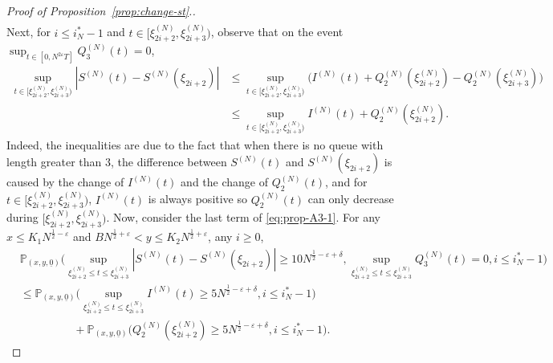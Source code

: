 \documentclass[11pt, reqno]{article}
\numberwithin{equation}{section}
\numberwithin{theorem}{section}
\begin{document}
\begin{appendix}
\begin{proof}[Proof of Proposition~\ref{prop:change-st}.]
\begin{align}
\end{align}
Next, for  $i\leq i^*_N-1$ and $t\in[\xi^{(N)}_{2i+2},\xi^{(N)}_{2i+3})$, observe that on the event $\sup_{t\in [0, N^{2\varepsilon}T]}Q_3^{(N)}(t) =0$, 
\begin{align*}
   \sup_{t\in[\xi^{(N)}_{2i+2},\xi^{(N)}_{2i+3})}\left| S^{(N)}(t)-S^{(N)}(\xi_{2i+2})\right| &\leq \sup_{t\in[\xi^{(N)}_{2i+2},\xi^{(N)}_{2i+3})}\Big(I^{(N)}(t)+Q_2^{(N)}(\xi^{(N)}_{2i+2})-Q_2^{(N)}(\xi^{(N)}_{2i+3})\Big)\\
   & \le \sup_{t\in[\xi^{(N)}_{2i+2},\xi^{(N)}_{2i+3})}I^{(N)}(t) + Q_2^{(N)}(\xi^{(N)}_{2i+2}).
\end{align*}
Indeed, the inequalities are due to the fact that when there is no queue with length greater than $3$, the difference between $S^{(N)}(t)$ and $S^{(N)}(\xi_{2i+2})$ is caused by the change of $I^{(N)}(t)$ and the change of $Q_2^{(N)}(t)$, and for $t\in[\xi^{(N)}_{2i+2},\xi^{(N)}_{2i+3})$, $I^{(N)}(t)$ is always positive so $Q_2^{(N)}(t)$ can only decrease during $[\xi^{(N)}_{2i+2},\xi^{(N)}_{2i+3})$. 
Now, consider the last term of \eqref{eq:prop-A3-1}. For any $x\leq K_1N^{\frac{1}{2} - \varepsilon}$ and $BN^{\frac{1}{2} + \varepsilon} <y\leq K_2N^{\frac{1}{2} + \varepsilon}$, any $i \ge 0$,
\begin{equation}\label{eq:prop-A3-4}
    \begin{split}
     &\mathbb{P}_{(x,y, \underline{0})}\Big(\sup_{\xi^{(N)}_{2i+2}\leq t\leq \xi^{(N)}_{2i+3}}\left|S^{(N)}(t)-S^{(N)}(\xi_{2i+2})\right|\geq 10 N^{\frac{1}{2}-\varepsilon+\delta}, \sup_{\xi^{(N)}_{2i+2}\leq t\leq \xi^{(N)}_{2i+3}}Q^{(N)}_3(t)=0,i\leq i^*_N-1\Big)\\
    &\leq  \mathbb{P}_{(x,y, \underline{0})}\Big(\sup_{\xi^{(N)}_{2i+2}\leq t\leq \xi^{(N)}_{2i+3}}I^{(N)}(t)\geq 5 N^{\frac{1}{2}-\varepsilon+\delta}, i\leq i^*_N-1\Big)\\
    &\hspace{2cm}+\mathbb{P}_{(x,y, \underline{0})}\Big(Q_2^{(N)}(\xi^{(N)}_{2i+2}) \geq 5N^{\frac{1}{2}-\varepsilon+\delta}, i\leq i^*_N-1\Big).
    \end{split}
\end{equation}


\end{proof}
\end{appendix}
\end{document}
